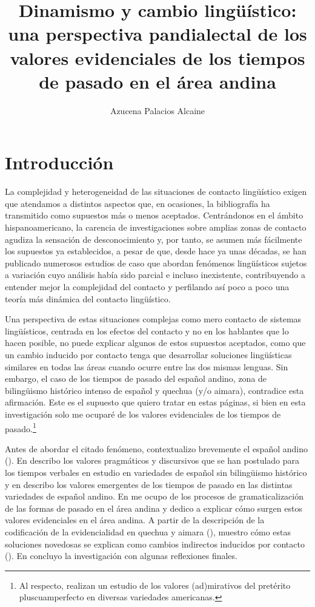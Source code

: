 \documentclass[output=paper]{../langscibook}
\author{Azucena Palacios Alcaine\orcid{0000-0002-9122-4362}\affiliation{Universidad Autónoma de Madrid}}
\title{Dinamismo y cambio lingüístico: una perspectiva pandialectal de los valores evidenciales de los tiempos de pasado en el área andina}
\begin{document}
\maketitle

\section{Introducción}\label{sec:palacios:1}

La complejidad y heterogeneidad de las situaciones de contacto lingüístico exigen que atendamos a distintos aspectos que, en ocasiones, la bibliografía ha transmitido como supuestos más o menos aceptados. Centrándonos en el ámbito hispanoamericano, la carencia de investigaciones sobre amplias zonas de contacto agudiza la sensación de desconocimiento y, por tanto, se asumen más fácilmente los supuestos ya establecidos, a pesar de que, desde hace ya unas décadas, se han publicado numerosos estudios de caso que abordan fenómenos lingüísticos sujetos a variación cuyo análisis había sido parcial e incluso inexistente, contribuyendo a entender mejor la complejidad del contacto y perfilando así poco a poco una teoría más dinámica del contacto lingüístico. 

Una perspectiva de estas situaciones complejas como mero contacto de sistemas lingüísticos, centrada en los efectos del contacto y no en los hablantes que lo hacen posible, no puede explicar algunos de estos supuestos aceptados, como que un cambio inducido por contacto tenga que desarrollar soluciones lingüísticas similares en todas las áreas cuando ocurre entre las dos mismas lenguas. Sin embargo, el caso de los tiempos de pasado del español andino, zona de bilingüismo histórico intenso de español y quechua (y/o aimara), contradice esta afirmación. Este es el supuesto que quiero tratar en estas páginas, si bien en esta investigación solo me ocuparé de los valores evidenciales de los tiempos de pasado.\footnote{Al respecto,   \citet{PalaciosAlcainePfänder2018} realizan un estudio de los valores (ad)mirativos del pretérito pluscuamperfecto en diversas variedades americanas.}

Antes de abordar el citado fenómeno, contextualizo brevemente el español andino (). En  describo los valores pragmáticos y discursivos que se han postulado para los tiempos verbales en estudio en variedades de español sin bilingüismo histórico y en  describo los valores emergentes de los tiempos de pasado en las distintas variedades de español andino. En  me ocupo de los procesos de gramaticalización de las formas de pasado en el área andina y dedico  a explicar cómo surgen estos valores evidenciales en el área andina. A partir de la descripción de la codificación de la evidencialidad en quechua y aimara (), muestro cómo estas soluciones novedosas se explican como cambios indirectos inducidos por contacto (). En  concluyo la investigación con algunas reflexiones finales.
\end{document}
